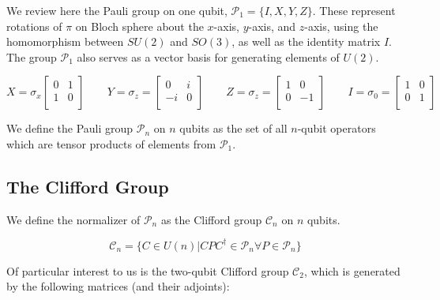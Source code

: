 We review here the Pauli group on one qubit, $\mathcal{P}_1 = \{I, X, Y, Z\}$.
These represent
rotations of $\pi$ on Bloch sphere about the $x$-axis, $y$-axis, and $z$-axis,
using the homomorphism between $SU(2)$ and $SO(3)$, as well as the
identity matrix $I$. The group $\mathcal{P}_1$ also serves as a vector
basis for generating elements of $U(2)$.

\begin{equation}
X = \sigma_x
 \left[
  \begin{array}{cc}
    0 & 1 \\
    1 & 0 \\
  \end{array} \right]
\qquad
Y = \sigma_z =
 \left[
  \begin{array}{cc}
    0 & i \\
   -i & 0 \\
  \end{array} \right]
\qquad
Z = \sigma_z =
 \left[
  \begin{array}{cc}
    1 & 0 \\
    0 & -1 \\
  \end{array} \right]
\qquad
I = \sigma_0 =
 \left[
  \begin{array}{cc}
    1 & 0 \\
    0 & 1 \\
  \end{array} \right]
\end{equation}

We define the Pauli group $\mathcal{P}_n$ on $n$ qubits as the set of
all $n$-qubit operators which are tensor products of elements from
$\mathcal{P}_1$.

\subsection{The Clifford Group}
\label{subsec:clifford}

We define the normalizer of $\mathcal{P}_n$ as the
Clifford group $\mathcal{C}_n$ on $n$ qubits.

\begin{equation}
\mathcal{C}_n = \{ C \in U(n) | CPC^{\dagger} \in \mathcal{P}_n \forall P \in \mathcal{P}_n \}
\end{equation}

Of particular interest to us is the two-qubit Clifford group $\mathcal{C}_2$,
which is generated by the following matrices (and their adjoints):

